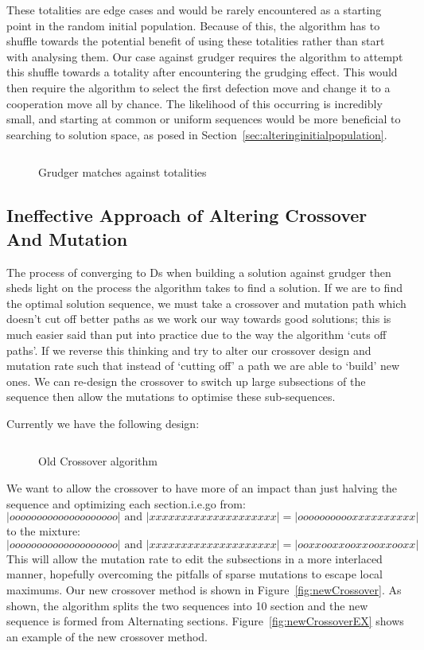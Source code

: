These totalities are edge cases and would be rarely encountered as a starting point in the random initial population.
Because of this, the algorithm has to shuffle towards the potential benefit of using these totalities rather than start with analysing them.
Our case against grudger requires the algorithm to attempt this shuffle towards a totality after encountering the grudging effect.
This would then require the algorithm to select the first defection move and change it to a cooperation move all by chance.
The likelihood of this occurring is incredibly small, and starting at common or uniform sequences would be more beneficial to searching to solution space, as posed in Section~\ref{sec:alteringinitialpopulation}.

\begin{figure}
    \inputminted{python}{code_snippets/grudgerTotalities.py}
    \caption{Grudger matches against totalities}\label{code:gudgerTotalities}
\end{figure}

\subsection{Ineffective Approach of Altering Crossover And Mutation}\label{subsec:ineffectiveApproachOfAlteringCrossoverAndMutation}
The process of converging to Ds when building a solution against grudger then sheds light on the process the algorithm takes to find a solution.
If we are to find the optimal solution sequence, we must take a crossover and mutation path which doesn't cut off better paths as we work our way towards good solutions;
this is much easier said than put into practice due to the way the algorithm `cuts off paths'.
If we reverse this thinking and try to alter our crossover design and mutation rate such that instead of `cutting off' a path we are able to `build' new ones.
We can re-design the crossover to switch up large subsections of the sequence then allow the mutations to optimise these sub-sequences.

Currently we have the following design:
\begin{figure}
    \inputminted{python}{code_snippets/oldCrossover.py}
    \caption{Old Crossover algorithm}\label{fig:oldCrossover}
\end{figure}

We want to allow the crossover to have more of an impact than just halving the sequence and optimizing each section.i.e.go from:
\[|oooooooooooooooooooo| \text{ and } |xxxxxxxxxxxxxxxxxxxx|= |ooooooooooxxxxxxxxxx|\]
to the mixture:
\[|oooooooooooooooooooo|\text{ and } |xxxxxxxxxxxxxxxxxxxx|= |ooxxooxxooxxooxxooxx|\]
This will allow the mutation rate to edit the subsections in a more interlaced manner, hopefully overcoming the pitfalls of sparse mutations to escape local maximums.
Our new crossover method is shown in Figure~\ref{fig:newCrossover}.
As shown, the algorithm splits the two sequences into 10 section and the new sequence is formed from Alternating sections.
Figure~\ref{fig:newCrossoverEX} shows an example of the new crossover method.

